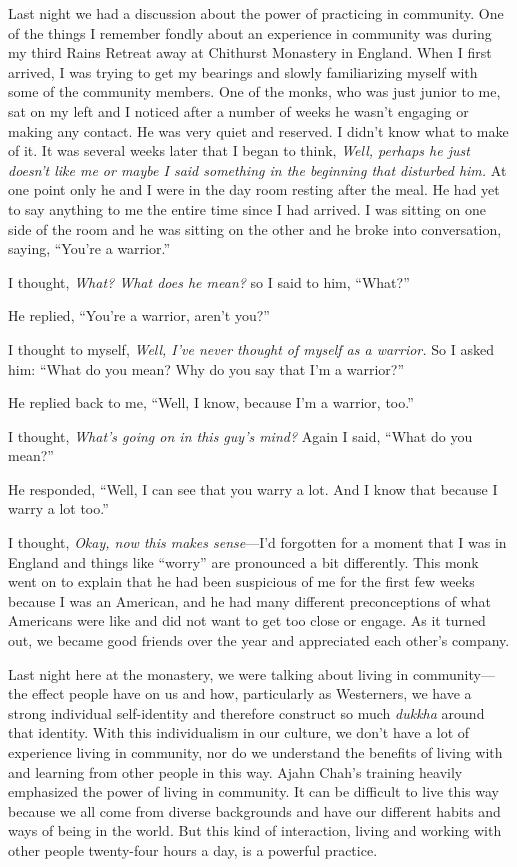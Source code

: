 Last night we had a discussion about the power of practicing in 
community. One of the things I remember fondly about an experience in 
community was during my third Rains Retreat away at Chithurst Monastery 
in England. When I first arrived, I was trying to get my bearings and 
slowly familiarizing myself with some of the community members. One of 
the monks, who was just junior to me, sat on my left and I noticed 
after a number of weeks he wasn't engaging or making any contact. He 
was very quiet and reserved. I didn't know what to make of it. It was 
several weeks later that I began to think, \emph{Well, perhaps he just 
doesn't like me or maybe I said something in the beginning that 
disturbed him.} At one point only he and I were in the day room resting 
after the meal. He had yet to say anything to me the entire time since 
I had arrived. I was sitting on one side of the room and he was sitting 
on the other and he broke into conversation, saying, ``You're a 
warrior.''

I thought, \emph{What? What does he mean?} so I said to him, ``What?''

He replied, ``You're a warrior, aren't you?''

I thought to myself, \emph{Well, I've never thought of myself as a 
warrior.} So I asked him: ``What do you mean? Why do you say that I'm a 
warrior?''

He replied back to me, ``Well, I know, because I'm a warrior, too.''

I thought, \emph{What's going on in this guy's mind?} Again I said, 
``What do you mean?''

He responded, ``Well, I can see that you warry a lot. And I know that 
because I warry a lot too.''

I thought, \emph{Okay, now this makes sense}---I'd forgotten for a 
moment that I was in England and things like ``worry'' are pronounced a 
bit differently. This monk went on to explain that he had been 
suspicious of me for the first few weeks because I was an American, and 
he had many different preconceptions of what Americans were like and 
did not want to get too close or engage. As it turned out, we became 
good friends over the year and appreciated each other's company.

Last night here at the monastery, we were talking about living in 
community---the effect people have on us and how, particularly as 
Westerners, we have a strong individual self-identity and therefore 
construct so much \emph{dukkha} around that identity. With this 
individualism in our culture, we don't have a lot of experience living 
in community, nor do we understand the benefits of living with and 
learning from other people in this way. Ajahn Chah's training heavily 
emphasized the power of living in community. It can be difficult to 
live this way because we all come from diverse backgrounds and have our 
different habits and ways of being in the world. But this kind of 
interaction, living and working with other people twenty-four hours a 
day, is a powerful practice.

